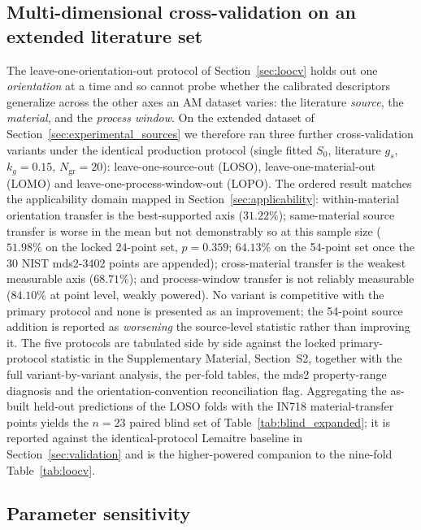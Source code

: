 \documentclass[12pt,a4paper,twocolumn]{article}
\begin{document}
\subsection{Multi-dimensional cross-validation on an extended literature set}
\label{sec:multidim_cv}

The leave-one-orientation-out protocol of Section~\ref{sec:loocv} holds out one \emph{orientation} at a time and so cannot probe whether the calibrated descriptors generalize across the other axes an AM dataset varies: the literature \emph{source}, the \emph{material}, and the \emph{process window}. On the extended dataset of Section~\ref{sec:experimental_sources} we therefore ran three further cross-validation variants under the identical production protocol (single fitted $S_0$, literature $g_s$, $k_g = 0.15$, $N_{\mathrm{gr}} = 20$): leave-one-source-out (LOSO), leave-one-material-out (LOMO) and leave-one-process-window-out (LOPO). The ordered result matches the applicability domain mapped in Section~\ref{sec:applicability}: within-material orientation transfer is the best-supported axis ($31.22\%$); same-material source transfer is worse in the mean but not demonstrably so at this sample size ($51.98\%$ on the locked 24-point set, $p = 0.359$; $64.13\%$ on the 54-point set once the 30 NIST mds2-3402 points are appended); cross-material transfer is the weakest measurable axis ($68.71\%$); and process-window transfer is not reliably measurable ($84.10\%$ at point level, weakly powered). No variant is competitive with the primary protocol and none is presented as an improvement; the 54-point source addition is reported as \emph{worsening} the source-level statistic rather than improving it. The five protocols are tabulated side by side against the locked primary-protocol statistic in the Supplementary Material, Section~S2, together with the full variant-by-variant analysis, the per-fold tables, the mds2 property-range diagnosis and the orientation-convention reconciliation flag. Aggregating the as-built held-out predictions of the LOSO folds with the IN718 material-transfer points yields the $n = 23$ paired blind set of Table~\ref{tab:blind_expanded}; it is reported against the identical-protocol Lemaitre baseline in Section~\ref{sec:validation} and is the higher-powered companion to the nine-fold Table~\ref{tab:loocv}.


\subsection{Parameter sensitivity}
\label{sec:sensitivity}
\end{document}
